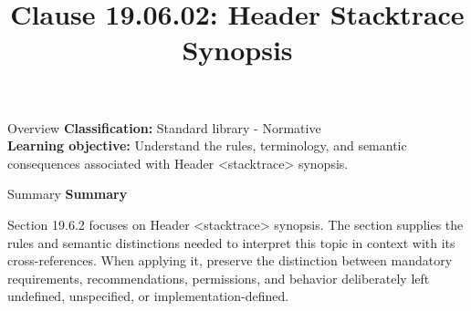 \documentclass[10pt,letterpaper]{article}
\title{Clause 19.06.02: Header Stacktrace Synopsis}
\author{}
\date{}
\begin{document}
\maketitle
\begin{CornellOverviewBox}{Overview}
\textbf{Classification:} Standard library - Normative\\[2pt]
\textbf{Learning objective:} Understand the rules, terminology, and semantic consequences associated with Header <stacktrace> synopsis.
\end{CornellOverviewBox}\begin{CornellSummaryBox}{Summary}
{\sffamily\bfseries\color{Accent} Summary}\par\vspace{3pt}Section 19.6.2 focuses on Header <stacktrace> synopsis. The section supplies the rules and semantic distinctions needed to interpret this topic in context with its cross-references. When applying it, preserve the distinction between mandatory requirements, recommendations, permissions, and behavior deliberately left undefined, unspecified, or implementation-defined.
\end{CornellSummaryBox}
\end{document}

